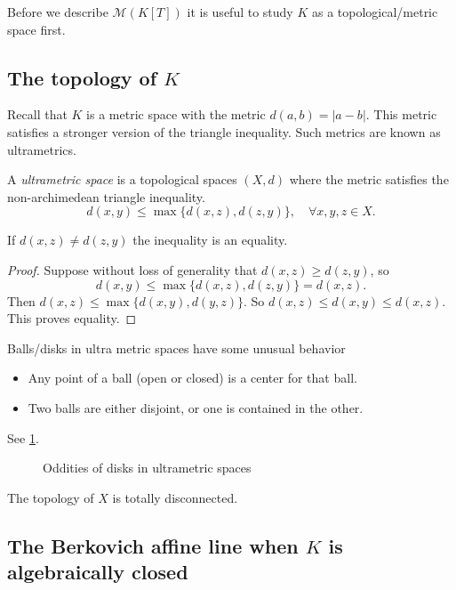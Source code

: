 Before we describe $\mathcal{M} (K[T])$ it is useful to study $K$ as a topological/metric space first.
\subsection{The topology of $K$} \label{sec:ultrametric_spaces}

Recall that $K$ is a metric space with the metric $d(a, b) = |a - b|$. 
This metric satisfies a stronger version of the triangle inequality. 
Such metrics are known as ultrametrics. 
\begin{definition}
	A \emph{ultrametric space} is a topological spaces $(X, d)$ where the metric satisfies the non-archimedean triangle inequality. 
	\[
		d(x, y) \le \max \{d(x, z) ,d(z, y)\}, \quad \forall x, y ,z \in X
	.\] 
\end{definition}
\begin{lemma}
	If $d(x,z) \ne d(z,y)$ the inequality is an equality. 
\end{lemma}
\begin{proof}
	Suppose without loss of generality that $d(x, z) \ge d(z,y)$, so 
	\[	
		d(x, y) \le \max \{d(x, z), d(z,y)\} = d(x, z)
	.\] 
	Then $d(x, z) \le \max \{d(x, y), d(y,z)\}$. So $d(x, z) \le d(x, y) \le d(x, z)$. This proves equality.
\end{proof}
\begin{corollary}
	Balls/disks in ultra metric spaces have some unusual behavior
	\begin{itemize}
		\item Any point of a ball (open or closed) is a center for that ball. 
		\item Two balls are either disjoint, or one is contained in the other.  
	\end{itemize}
	See \cref{fig:oddities_of_ultrametric_balls}.
\end{corollary}
\begin{figure}[h]
    \centering
    \caption{Oddities of disks in ultrametric spaces}
    \label{fig:oddities_of_ultrametric_balls}
\end{figure}
\begin{corollary}
	The topology of $X$ is totally disconnected. 
\end{corollary}

\subsection{The Berkovich affine line when $K$ is algebraically closed} \label{sec:the_berkovich_affine_line}

